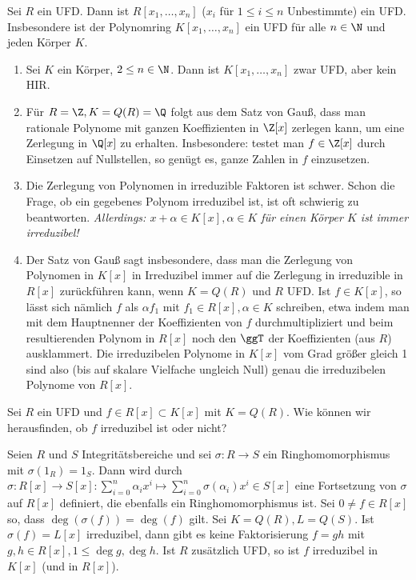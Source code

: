 \begin{kor} \label{15.3-9}
	Sei $R$ ein UFD.
	Dann ist $R[x_1, \dotsc, x_n]$ ($x_i$ für $1 \le i \le n$ Unbestimmte) ein UFD.
	Insbesondere ist der Polynomring $K[x_1, \dotsc, x_n]$ ein UFD für alle $n \in \N$ und jeden Körper $K$.
\end{kor}

\setcounter{thm}{10}
\begin{nt} \label{15.3-11}
	\begin{enumerate}[1)]
		\item
			Sei $K$ ein Körper, $2 \le n \in \N$.
			Dann ist $K[x_1, \dotsc, x_n]$ zwar UFD, aber kein HIR.
		\item
			Für $R = \Z, K = Q(R) = \Q$ folgt aus dem Satz von Gauß, dass man rationale Polynome mit ganzen Koeffizienten in $\Z[x]$ zerlegen kann, um eine Zerlegung in $\Q[x]$ zu erhalten.
			Insbesondere: testet man $f \in \Z[x]$ durch Einsetzen auf Nullstellen, so genügt es, ganze Zahlen in $f$ einzusetzen.
		\item
			Die Zerlegung von Polynomen in irreduzible Faktoren ist schwer.
			Schon die Frage, ob ein gegebenes Polynom irreduzibel ist, ist oft schwierig zu beantworten.
			\emph{Allerdings: $x + \alpha \in K[x], \alpha \in K$ für einen Körper $K$ ist immer irreduzibel!}
		\item
			Der Satz von Gauß sagt insbesondere, dass man die Zerlegung von Polynomen in $K[x]$ in Irreduzibel immer auf die Zerlegung in irreduzible in $R[x]$ zurückführen kann, wenn $K = Q(R)$ und $R$ UFD.
			Ist $f \in K[x]$, so lässt sich nämlich $f$ als $\alpha f_1$ mit $f_1 \in R[x], \alpha \in K$ schreiben, etwa indem man mit dem Hauptnenner der Koeffizienten von $f$ durchmultipliziert und beim resultierenden Polynom in $R[x]$ noch den $\ggT$ der Koeffizienten (aus $R$) ausklammert.
			Die irreduzibelen Polynome in $K[x]$ vom Grad größer gleich 1 sind also (bis auf skalare Vielfache ungleich Null) genau die irreduzibelen Polynome von $R[x]$.
	\end{enumerate}
\end{nt}

Sei $R$ ein UFD und $f \in R[x] \subset K[x]$ mit $K = Q(R)$.
Wie können wir herausfinden, ob $f$ irreduzibel ist oder nicht?

\begin{st}[Reduktionskriterium] \label{15.3-12}
	Seien $R$ und $S$ Integritätsbereiche und sei $\sigma: R \to S$ ein Ringhomomorphismus mit $\sigma(1_R) = 1_S$.
	Dann wird durch $\sigma: R[x] \to S[x] : \sum_{i=0}^n \alpha_i x^i \mapsto \sum_{i=0}^n \sigma(\alpha_i) x^i \in S[x]$ eine Fortsetzung von $\sigma$ auf $R[x]$ definiert, die ebenfalls ein Ringhomomorphismus ist.
	Sei $0 \neq f \in R[x]$ so, dass $\deg(\sigma(f)) = \deg(f)$ gilt.
	Sei $K = Q(R), L = Q(S)$.
	Ist $\sigma(f) = L[x]$ irreduzibel, dann gibt es keine Faktorisierung $f = gh$ mit $g, h \in R[x], 1 \le \deg g, \deg h$.
	Ist $R$ zusätzlich UFD, so ist $f$ irreduzibel in $K[x]$ (und in $R[x]$).
\end{st}

